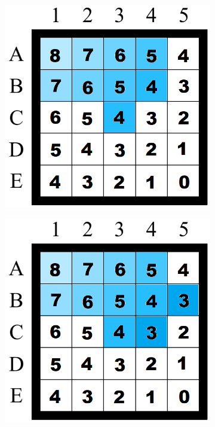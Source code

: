 \begin{figure}[H]
\begin{subfigure}[b]{.3\textwidth}
\end{subfigure}
\begin{subfigure}[b]{.3\textwidth}
  \centering
  \includegraphics[width=0.95\linewidth]{Report/Part2/g tie breaker/larger g/5.png}  
\end{subfigure}
\begin{subfigure}[b]{.3\textwidth}
  \centering
  \includegraphics[width=0.95\linewidth]{Report/Part2/g tie breaker/larger g/6.png}  

\end{subfigure}
\end{figure}
